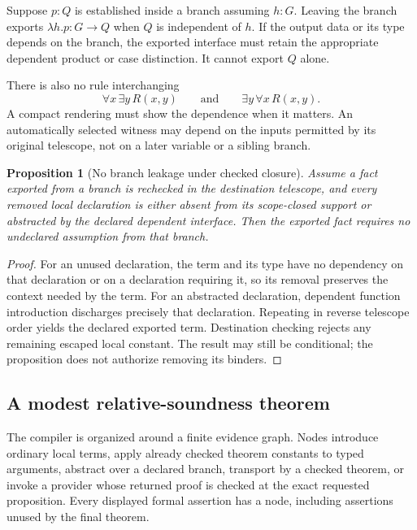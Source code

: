 \documentclass[11pt,letterpaper]{article}
\newtheorem{proposition}[definition]{Proposition}
\theoremstyle{remark}
\begin{document}
Suppose $p:Q$ is established inside a branch assuming $h:G$. Leaving the
branch exports $\lambda h.p:G\to Q$ when $Q$ is independent of $h$. If the
output data or its type depends on the branch, the exported interface must
retain the appropriate dependent product or case distinction. It cannot
export $Q$ alone.

There is also no rule interchanging
\[
 \forall x\,\exists y\,R(x,y)
 \qquad\text{and}\qquad
 \exists y\,\forall x\,R(x,y).
\]
A compact rendering must show the dependence when it matters. An automatically
selected witness may depend on the inputs permitted by its original telescope,
not on a later variable or a sibling branch.

\begin{proposition}[No branch leakage under checked closure]
Assume a fact exported from a branch is rechecked in the destination telescope,
and every removed local declaration is either absent from its scope-closed
support or abstracted by the declared dependent interface. Then the exported
fact requires no undeclared assumption from that branch.
\end{proposition}
\begin{proof}
For an unused declaration, the term and its type have no dependency on that
declaration or on a declaration requiring it, so its removal preserves the
context needed by the term. For an abstracted declaration, dependent function
introduction discharges precisely that declaration. Repeating in reverse
telescope order yields the declared exported term. Destination checking
rejects any remaining escaped local constant. The result may still be
conditional; the proposition does not authorize removing its binders.
\end{proof}

\subsection{A modest relative-soundness theorem}
The compiler is organized around a finite evidence graph. Nodes introduce
ordinary local terms, apply already checked theorem constants to typed
arguments, abstract over a declared branch, transport by a checked theorem,
or invoke a provider whose returned proof is checked at the exact requested
proposition. Every displayed formal assertion has a node, including assertions
unused by the final theorem.
\end{document}
